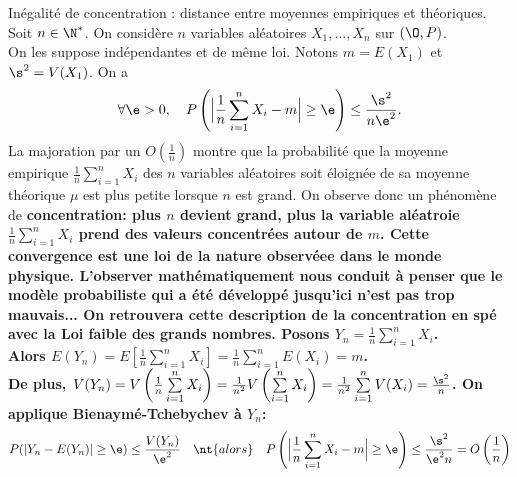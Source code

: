 \documentclass[11pt]{article}
\begin{document}
\begin{ex}{Inégalité de concentration : distance entre moyennes empiriques et théoriques.}{}
    Soit $n\in\N^*$. On considère $n$ variables aléatoires $X_1,...,X_n$ sur $(\O,P)$.\\
    On les suppose indépendantes et de même loi. Notons $m=E(X_1)$ et $\s^2=V(X_1)$. On a
    \begin{equation*}
        \forall \e > 0, \quad P\left( \Big| \frac{1}{n}\sum_{i=1}^nX_i-m \Big| \geq \e\right) \leq \frac{\s^2}{n\e^2}.
    \end{equation*}
    La majoration par un $O(\frac{1}{n})$ montre que la probabilité que la moyenne empirique $\frac{1}{n}\sum\limits_{i=1}^nX_i$ des $n$ variables aléatoires soit éloignée de sa moyenne théorique $\mu$ est plus petite lorsque $n$ est grand.\n
    On observe donc un phénomène de \bf{concentration}: plus $n$ devient grand, plus la variable aléatroie $\frac{1}{n}\sum\limits_{i=1}^nX_i$ prend des valeurs concentrées autour de $m$. Cette convergence est une loi de la nature observéee dans le monde physique. L'observer mathématiquement nous conduit à penser que le modèle probabiliste qui a été développé jusqu'ici n'est pas trop mauvais...\n
    On retrouvera cette description de la concentration en spé avec la Loi faible des grands nombres.
    \tcblower
    Posons $Y_n=\frac{1}{n}\sum_{i=1}^nX_i$.\\
    Alors $E(Y_n)=E\left[ \frac{1}{n}\sum\limits_{i=1}^nX_i \right]=\frac{1}{n}\sum\limits_{i=1}^nE(X_i)=m$.\\
    De plus, $V(Y_n)=V\left( \frac{1}{n}\sum\limits_{i=1}^nX_i\right)=\frac{1}{n^2}V\left( \sum\limits_{i=1}^nX_i \right)=\frac{1}{n^2}\sum\limits_{i=1}^nV(X_i)=\frac{\s^2}{n}$.\n
    On applique Bienaymé-Tchebychev à $Y_n$:
    \begin{equation*}
        P(|Y_n-E(Y_n)|\geq\e)\leq \frac{V(Y_n)}{\e^2} \quad\nt{alors}\quad P\left(\Big|\frac{1}{n}\sum_{i=1}^nX_i-m\Big|\geq\e\right)\leq\frac{\s^2}{\e^2n}=O\left(\frac{1}{n}\right)
    \end{equation*}
\end{ex}
\end{document}
